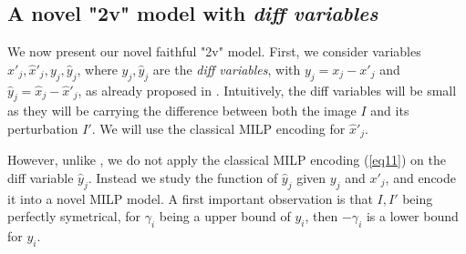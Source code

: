 	

 


	\subsection{A novel "2v" model with {\em diff variables}}

	We now present our novel faithful "2v" model.
    First, we consider variables $x'_j,\hat{x}'_j, y_j, \hat{y}_j$, where $y_j, \hat{y}_j$ are the {\em diff variables}, with     $y_j = x_j - x'_j$ and $\hat{y}_j= \hat{x}_j - \hat{x}'_j$, as already proposed in \cite{lipshitz}. 	Intuitively, the diff variables will be small as they will be carrying the difference between both the image $I$ and its perturbation $I'$.
    We will use the classical MILP encoding for $\hat{x}'_j$.

    However, unlike \cite{lipshitz}, we do not apply the classical MILP encoding (\ref{eq11}) \cite{MILP} on the diff variable $\hat{y}_j$. Instead we study the function of 
    $\hat{y}_j$ given $y_j$ and $x'_j$, and encode it into a novel MILP model.
    A first important observation is that $I,I'$ being perfectly symetrical,
    for $\gamma_i$ being a upper bound of $y_i$, then $-\gamma_i$ is a lower bound 
    for $y_i$.

	
	
